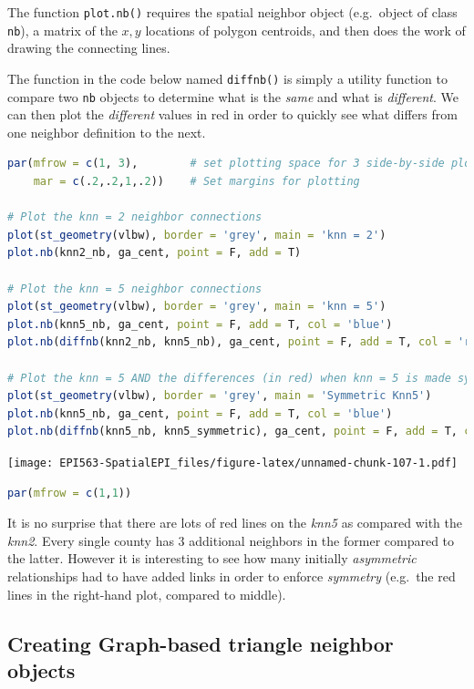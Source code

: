 \documentclass[
]{book}
\newcommand{\passthrough}[1]{#1}
\begin{document}
The function \passthrough{\lstinline!plot.nb()!} requires the spatial neighbor object (e.g.~object of class \passthrough{\lstinline!nb!}), a matrix of the \(x, y\) locations of polygon centroids, and then does the work of drawing the connecting lines.

The function in the code below named \passthrough{\lstinline!diffnb()!} is simply a utility function to compare two \passthrough{\lstinline!nb!} objects to determine what is the \emph{same} and what is \emph{different}. We can then plot the \emph{different} values in red in order to quickly see what differs from one neighbor definition to the next.

\begin{lstlisting}[language=R]
par(mfrow = c(1, 3),        # set plotting space for 3 side-by-side plots
    mar = c(.2,.2,1,.2))    # Set margins for plotting

# Plot the knn = 2 neighbor connections
plot(st_geometry(vlbw), border = 'grey', main = 'knn = 2')
plot.nb(knn2_nb, ga_cent, point = F, add = T)

# Plot the knn = 5 neighbor connections
plot(st_geometry(vlbw), border = 'grey', main = 'knn = 5')
plot.nb(knn5_nb, ga_cent, point = F, add = T, col = 'blue')
plot.nb(diffnb(knn2_nb, knn5_nb), ga_cent, point = F, add = T, col = 'red')

# Plot the knn = 5 AND the differences (in red) when knn = 5 is made symmetric
plot(st_geometry(vlbw), border = 'grey', main = 'Symmetric Knn5')
plot.nb(knn5_nb, ga_cent, point = F, add = T, col = 'blue')
plot.nb(diffnb(knn5_nb, knn5_symmetric), ga_cent, point = F, add = T, col = 'red')
\end{lstlisting}

\texttt{[image: EPI563-SpatialEPI\_files/figure-latex/unnamed-chunk-107-1.pdf]}

\begin{lstlisting}[language=R]
par(mfrow = c(1,1))
\end{lstlisting}

It is no surprise that there are lots of red lines on the \emph{knn5} as compared with the \emph{knn2}. Every single county has 3 additional neighbors in the former compared to the latter. However it is interesting to see how many initially \emph{asymmetric} relationships had to have added links in order to enforce \emph{symmetry} (e.g.~the red lines in the right-hand plot, compared to middle).

\hypertarget{creating-graph-based-triangle-neighbor-objects}{%
\subsection{Creating Graph-based triangle neighbor objects}\label{creating-graph-based-triangle-neighbor-objects}}
\end{document}
